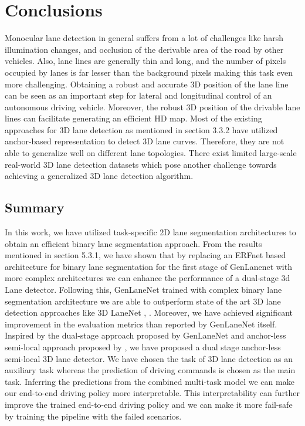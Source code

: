 



    \chapter{Conclusions}
    Monocular lane detection in general suffers from a lot of challenges like harsh illumination changes, and occlusion of the derivable area of the road by other vehicles. Also, lane lines are generally thin and long, and the number of pixels occupied by lanes is far lesser than the background pixels making this task even more challenging. Obtaining a robust and accurate 3D position of the lane line can be seen as an important step for lateral and longitudinal control of an autonomous driving vehicle. Moreover, the robust 3D position of the drivable lane lines can facilitate generating an efficient HD map. Most of the existing approaches for 3D lane detection as mentioned in section 3.3.2 have utilized anchor-based representation to detect 3D lane curves. Therefore, they are not able to generalize well on different lane topologies. There exist limited large-scale real-world 3D lane detection datasets which pose another challenge towards achieving a generalized 3D lane detection algorithm.
     
    

    \section{Summary}
    In this work, we have utilized task-specific 2D lane segmentation architectures to obtain an efficient binary lane segmentation approach.
    From the results mentioned in section 5.3.1, we have shown that by replacing an ERFnet \cite{Romera2018ERFNetER} based architecture for binary lane segmentation for the first stage of GenLanenet \cite{guo2020gen} with more complex architectures we can enhance the performance of a dual-stage 3d Lane detector. Following this, GenLaneNet \cite{guo2020gen} trained with complex binary lane segmentation architecture we are able to outperform state of the art 3D lane detection approaches like 3D LaneNet \cite{DBLP:journals/corr/abs-1811-10203}, \cite{9506296}. Moreover, we have achieved significant improvement in the evaluation metrics than reported by GenLaneNet \cite{guo2020gen} itself. Inspired by the dual-stage approach proposed by GenLaneNet \cite{guo2020gen}
    and anchor-less semi-local approach proposed by \cite{DBLP:journals/corr/abs-2011-01535}, we have proposed a dual stage anchor-less semi-local 3D lane detector. We have chosen the task of 3D lane detection as an auxiliary task whereas the prediction of driving commands is chosen as the main task. Inferring the predictions from the combined multi-task model we can make our end-to-end driving policy more interpretable. This interpretability can further improve the trained end-to-end driving policy and we can make it more fail-safe by training the pipeline with the failed scenarios.  

